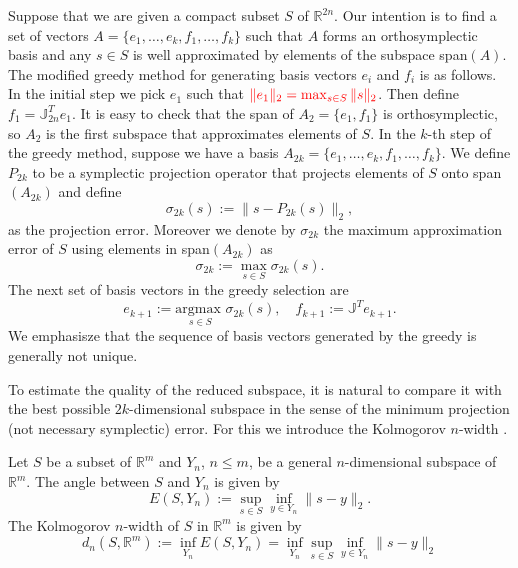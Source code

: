 Suppose that we are given a compact subset $S$ of $\mathbb R^{2n}$. Our intention is to find a set of vectors $A=\{e_1,\dots,e_k,f_1,\dots,f_k\}$ such that $A$ forms {\edit an orthosymplectic} basis and any $s\in S$ is well approximated by elements of the subspace span$(A)$. The modified greedy method for generating basis vectors $e_i$ and $f_i$ is as follows. In the initial step we pick $e_1$ such that $\color{red} \|e_1\|_2 = \max_{s\in S} \|s\|_2$. Then define $f_1 = \mathbb{J}_{2n}^T e_1$. It is easy to check that the span of $A_2 = \{e_1,f_1\}$ is {\edit orthosymplectic}, so $A_2$ is the first subspace that approximates elements of $S$. In the $k$-th step of the greedy method, suppose we have a basis $A_{2k} = \{ e_1,\dots, e_k , f_1,\dots ,f_k \}$. We define $P_{2k}$ to be a symplectic projection operator that projects elements of $S$ onto span$(A_{2k})$ and define
\begin{equation} \label{eq:new1}
	\sigma_{2k}(s) := \|s-P_{2k}(s)\|_2,
\end{equation}
as the projection error. Moreover we denote by $\sigma_{2k}$ the maximum approximation error of $S$ using elements in span$(A_{2k})$ as
\begin{equation} \label{eq:new2}
	\sigma_{2k} := \max_{s\in S} \sigma_{2k}(s).
\end{equation}
The next set of basis vectors in the greedy selection are
\begin{equation} \label{eq:new3}
	e_{k+1} := \underset{s\in S}{\text{argmax }}\sigma_{2k}(s), \quad f_{k+1} := \mathbb{J}^T e_{k+1}.
\end{equation}
We emphasisze that the sequence of basis vectors generated by the greedy is generally not unique. 

To estimate the quality of the reduced subspace, it is natural to compare it with the best possible $2k$-dimensional subspace in the sense of the minimum projection (not necessary symplectic) error. For this we introduce the Kolmogorov $n$-width \cite{Kolmogoroff:1936fj,Pinkus:1985vy}.

\begin{definition}
Let $S$ be a subset of $\mathbb R^{m}$ and $Y_n$, $n\leq m$, be a general $n$-dimensional subspace of $\mathbb R^{m}$. The angle between $S$ and $Y_n$ is given by
\begin{equation} \label{eq:new4}
	E(S,Y_n) := \sup_{s\in S} \inf_{y\in Y_n} \|s-y\|_2.
\end{equation}
The Kolmogorov $n$-width of $S$ in $\mathbb R^m$ is given by
\begin{equation} \label{eq:new5}
	d_{n}(S,\mathbb{R}^m) := \inf_{Y_n} E(S,Y_n) = \inf_{Y_n} \sup_{s\in S} \inf_{y\in Y_n} \|s-y\|_2
\end{equation}
\end{definition}

